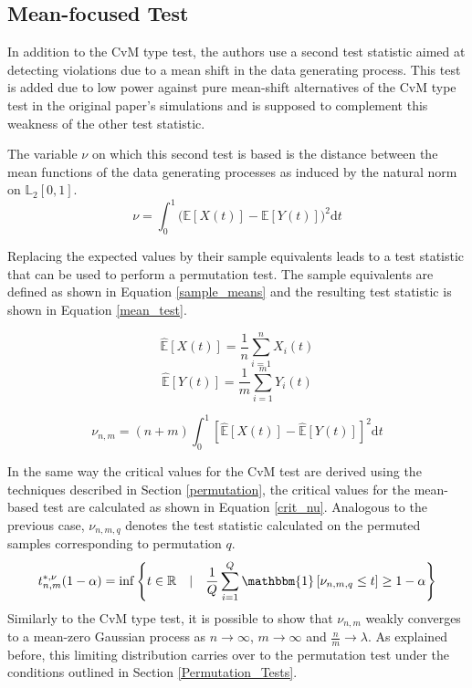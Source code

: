\documentclass[12pt, a4paper]{article}
\theoremstyle{MAstyle} \newtheorem{assumption}{Assumption}[section]
\theoremstyle{MAstyle} \newtheorem{definition}{Definition}[section]
\theoremstyle{MAstyle} \newtheorem{theorem}{Theorem}[section]
\begin{document}
		\subsection{Mean-focused Test}\label{mean_based_test}
			In addition to the CvM type test, the authors use a second test statistic aimed at detecting violations due to a mean shift in the data generating process. This test is added due to low power against pure mean-shift alternatives of the CvM type test in the original paper's simulations and is supposed to complement this weakness of the other test statistic.
			
			The variable $\nu$ on which this second test is based is the distance between the mean functions of the data generating processes as induced by the natural norm on $\mathbb{L}_2[0,1]$.
			\begin{equation}
				\nu = \int_{0}^{1} \big(\mathbb{E}\left[X(t)\right] - \mathbb{E}\left[Y(t)\right]\big)^2 \mathrm{d}t
			\end{equation}
		
			Replacing the expected values by their sample equivalents leads to a test statistic that can be used to perform a permutation test. The sample equivalents are defined as shown in Equation \ref{sample_means} and the resulting test statistic is shown in Equation \ref{mean_test}.
			\begin{multicols}{2}
				\noindent
				\begin{equation*}
					\hat{\mathbb{E}}\left[X(t)\right] = \frac{1}{n}\sum_{i = 1}^{n} X_i(t)
				\end{equation*}
				\begin{equation}\label{sample_means}
					\hat{\mathbb{E}}\left[Y(t)\right] = \frac{1}{m}\sum_{i = 1}^{m} Y_i(t)
				\end{equation}
			\end{multicols}
			\begin{equation}\label{mean_test}
				\nu_{n,m} = (n+m) \int_{0}^{1} \left[\hat{\mathbb{E}}\left[X(t)\right] - \hat{\mathbb{E}}\left[Y(t)\right] \right]^2 \mathrm{d}t
			\end{equation}
		
			In the same way the critical values for the CvM test are derived using the techniques described in Section \ref{permutation}, the critical values for the mean-based test are calculated as shown in Equation \ref{crit_nu}. Analogous to the previous case, $\nu_{n,m,q}$ denotes the test statistic  calculated on the permuted samples corresponding to permutation $q$.
			\begin{equation}\label{crit_nu}
				t^{*, \nu}_{n,m}(1-\alpha) = \inf \left\{t \in \mathbb{R} \quad \vert \quad \frac{1}{Q} \sum_{i = 1}^{Q} \mathbbm{1}\left[\nu_{n,m,q} \leq t\right] \geq 1 - \alpha \right\}
			\end{equation}
			Similarly to the CvM type test, it is possible to show that $\nu_{n,m}$ weakly converges to a mean-zero Gaussian process as $n \rightarrow \infty$, $m \rightarrow \infty$ and $\frac{n}{m} \rightarrow \lambda$. As explained before, this limiting distribution carries over to the permutation test under the conditions outlined in Section \ref{Permutation_Tests}.
\end{document}
